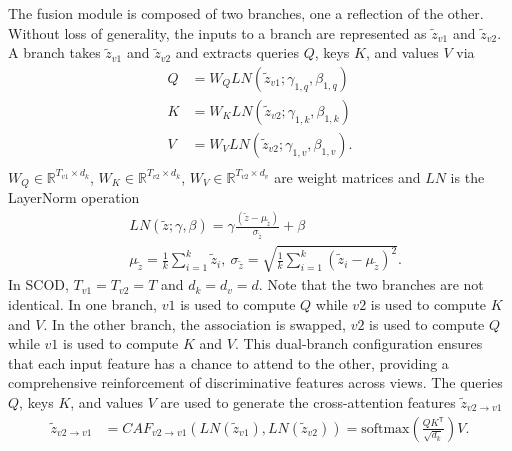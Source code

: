 The fusion module is composed of two branches, one a reflection of the other. Without loss of generality, the inputs to a branch are represented as $\tilde{z}_{v1}$ and $\tilde{z}_{v2}$. A branch takes $\tilde{z}_{v1}$ and $\tilde{z}_{v2}$ and extracts queries $Q$, keys $K$, and values $V$ via
\begin{equation}
\begin{aligned}
    Q & = W_Q LN(\tilde{z}_{v1}; \gamma_{1,q}, \beta_{1,q}) \\
    K & = W_K LN(\tilde{z}_{v2}; \gamma_{1,k}, \beta_{1,k}) \\
    V & = W_V LN(\tilde{z}_{v2}; \gamma_{1,v}, \beta_{1,v}). \\
\end{aligned}
\end{equation}
$W_Q \in \mathbb{R}^{T_{v1} \times d_k}$, $W_K \in \mathbb{R}^{T_{v2} \times d_k}$, $W_V \in \mathbb{R}^{T_{v2} \times d_v}$ are weight matrices and $LN$ is the LayerNorm operation \cite{xu2019understanding}
\begin{equation}
\begin{aligned}
    & LN(\tilde{z}; \gamma, \beta) = \gamma \frac{(\tilde{z} - \mu_{\tilde{z}})}{\sigma_{\tilde{z}}} + \beta \\
    & \mu_{\tilde{z}} = \frac{1}{k} \sum_{i=1}^{k} \tilde{z}_i,\ \sigma_{\tilde{z}} = \sqrt{\frac{1}{k} \sum_{i=1}^{k} (\tilde{z}_i - \mu_{\tilde{z}})^2}.
\end{aligned}
\end{equation}
In SCOD, $T_{v1} = T_{v2} = T$ and $d_k = d_v = d$.
Note that the two branches are not identical. In one branch, $v1$ is used to compute $Q$ while $v2$ is used to compute $K$ and $V$. In the other branch, the association is swapped, $v2$ is used to compute $Q$ while $v1$ is used to compute $K$ and $V$. This dual-branch configuration ensures that each input feature has a chance to attend to the other, providing a comprehensive reinforcement of discriminative features across views.
The queries $Q$, keys $K$, and values $V$ are used to generate the cross-attention features $\tilde{z}_{v2 \rightarrow v1}$
\begin{equation}
\begin{split}
     \tilde{z}_{v2 \rightarrow v1} & = CAF_{v2 \rightarrow v1}(LN(\tilde{z}_{v1}), LN(\tilde{z}_{v2})) 
     = \text{softmax} \left( \frac{Q K^{\mathsf{T}}}{\sqrt{d_{k}}} \right) V.
\end{split}
\end{equation}


